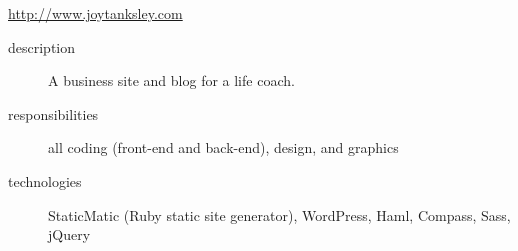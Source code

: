 \documentclass{article}
\begin{document}
\begin{multicols}{2}
\href{http://www.joytanksley.com}{http://www.joytanksley.com}

\begin{description}
  \item[description] A business site and blog for a life coach. 
  \item[responsibilities] all coding (front-end and back-end), design, and graphics 
  \item[technologies] StaticMatic (Ruby static site generator), WordPress, Haml, Compass, Sass, jQuery 
\end{description}

\vfill
\columnbreak
{}
\end{multicols}

\end{document}
